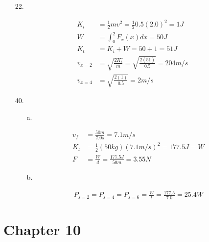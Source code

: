 \begin{itemize}
\begin{itemize}
            \end{itemize}

        \item [22.]
        
            \begin{align*}
                K_{i}   & = \frac{1}{2}mv^{2} = \frac{1}{2}0.5(2.0)^{2} = 1 J   \\ 
                W       & = \int_{0}^{2}F_{x}(x)dx = 50 J                       \\
                K_{t}   & = K_{i} + W = 50 + 1 = 51 J                           \\
                v_{x=2} & = \sqrt{\frac{2K_{t}}{m}} = \sqrt{\frac{2(51)}{0.5}} 
                          = \boxed{204 m/s}                                     \\
                v_{x=4} & = \sqrt{\frac{2(1)}{0.5}} = \boxed{2 m/s}
            \end{align*}

        \item [40.]
        
            \begin{itemize}
                \item [a.]

                    \begin{align*}
                        v_{f}   & = \frac{50 m}{7.0 s} = 7.1 m/s                        \\
                        K_{t}   & = \frac{1}{2}(50 kg)(7.1 m/s)^{2} = 177.5 J = W       \\
                        F       & = \frac{W}{d} = \frac{177.5 J}{50 m} = \boxed{3.55 N}
                    \end{align*}

                \item [b.]
                
                    \begin{align*}
                        P_{s=2} = P_{s=4} = P_{s=6} = \frac{W}{t} = \frac{177.5}{7.0} 
                            = \boxed{25.4 W} 
                    \end{align*}

            \end{itemize}

    \end{itemize}

    \pagebreak

    \section*{Chapter 10}

